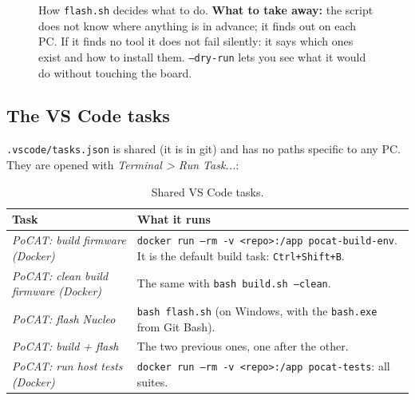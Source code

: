 \documentclass[11pt,a4paper]{article}
\DeclareRobustCommand{\_}{\textunderscore\allowbreak}
\newcommand{\cd}[1]{\texttt{#1}}
\newcommand{\fl}{\ensuremath{\rightarrow}}
\begin{document}
\begin{figure}[p]
\caption{How \cd{flash.sh} decides what to do. \textbf{What to take away:} the script does not know where anything is in
advance; it finds out on each PC. If it finds no tool it does not fail silently: it says which ones exist and how to
install them. \cd{--dry-run} lets you see what it would do without touching the board.}
\label{fig:flashsh}
\end{figure}

\subsection{The VS Code tasks}

\cd{.vscode/tasks.json} is shared (it is in git) and has no paths specific to any PC. They are opened
with \emph{Terminal > Run Task...}:

\begin{table}[H]
\centering\small
\begin{tabularx}{\textwidth}{@{}>{\raggedright\arraybackslash}p{5.6cm}>{\raggedright\arraybackslash}X@{}}
\toprule
Task & What it runs\\
\midrule
\emph{PoCAT: build firmware (Docker)} & \cd{docker run --rm -v <repo>:/app pocat-build-env}. It is the default build task: \cd{Ctrl+Shift+B}.\\
\emph{PoCAT: clean build firmware (Docker)} & The same with \cd{bash build.sh --clean}.\\
\emph{PoCAT: flash Nucleo} & \cd{bash flash.sh} (on Windows, with the \cd{bash.exe} from Git Bash).\\
\emph{PoCAT: build + flash} & The two previous ones, one after the other.\\
\emph{PoCAT: run host tests (Docker)} & \cd{docker run --rm -v <repo>:/app pocat-tests}: all suites.\\
\bottomrule
\end{tabularx}
\caption{Shared VS Code tasks.}
\end{table}
\end{document}
